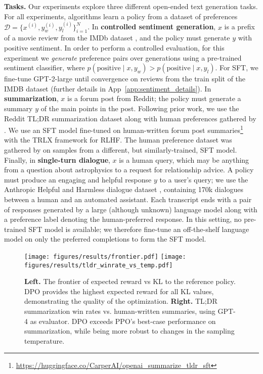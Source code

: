 \documentclass{article}
\begin{document}
\textbf{Tasks.} Our experiments explore three different open-ended text generation tasks. For all experiments, algorithms learn a policy from a dataset of preferences $\mathcal{D}=\bigl\{x^{(i)}, y_w^{(i)}, y_l^{(i)}\bigr\}_{i=1}^N$. In \textbf{controlled sentiment generation}, $x$ is a prefix of a movie review from the IMDb dataset \cite{maas-EtAl:2011:ACL-HLT2011}, and the policy must generate $y$ with positive sentiment. In order to perform a controlled evaluation, for this experiment we \textit{generate} preference pairs over generations using a pre-trained sentiment classifier, where $p(\text{positive}\mid x,y_w)>p(\text{positive}\mid x,y_l)$. For SFT, we fine-tune GPT-2-large until convergence on reviews from the train split of the IMDB dataset (further details in App~\ref{app:sentiment_details}). In \textbf{summarization}, $x$ is a forum post from Reddit; the policy must generate a summary $y$ of the main points in the post. Following prior work, we use the Reddit TL;DR summarization dataset \citep{volske-etal-2017-tl} along with human preferences gathered by \citeauthor{stiennon2022learning}. We use an SFT model fine-tuned on human-written forum post summaries\footnote{\url{https://huggingface.co/CarperAI/openai_summarize_tldr_sft}} with the TRLX \citep{leandro_von_werra_2023_7790115} framework for RLHF. The human preference dataset was gathered by \citeauthor{stiennon2022learning} on samples from a different, but similarly-trained, SFT model. Finally, in \textbf{single-turn dialogue}, 
$x$ is a human query, which may be anything from a question about astrophysics to a request for relationship advice. A policy must produce an engaging and helpful response $y$ to a user's query; we use the Anthropic Helpful and Harmless dialogue dataset \citep{bai2022training}, containing 170k dialogues between a human and an automated assistant. Each transcript ends with a pair of responses generated by a large (although unknown) language model along with a preference label denoting the human-preferred response. In this setting, no pre-trained SFT model is available; we therefore fine-tune an off-the-shelf language model on only the preferred completions to form the SFT model.

\begin{figure}
    \centering
    \texttt{[image: figures/results/frontier.pdf]}
    \texttt{[image: figures/results/tldr\_winrate\_vs\_temp.pdf]}
    \caption{\textbf{Left.} The frontier of expected reward vs KL to the reference policy. DPO provides the highest expected reward for all KL values, demonstrating the quality of the optimization. \textbf{Right.} TL;DR summarization win rates vs. human-written summaries, using GPT-4 as evaluator. DPO exceeds PPO's best-case performance on summarization, while being more robust to changes in the sampling temperature.}
    \vspace{-2mm}
    \label{fig:frontier-tldr-main}
\end{figure}
\end{document}
